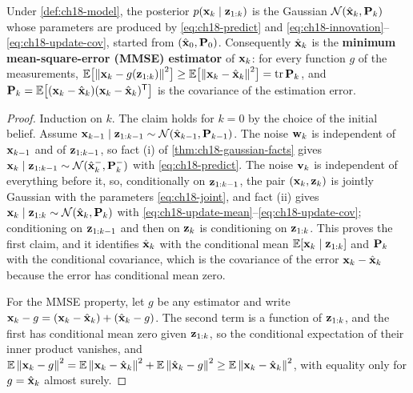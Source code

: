 \begin{theorem}
\label{thm:ch18-optimal}
Under \cref{def:ch18-model}, the posterior $p(\mathbf{x}_k\mid\mathbf{z}_{1:k})$ is
the Gaussian $\mathcal{N}(\hat{\mathbf{x}}_k,\mathbf{P}_k)$ whose parameters are
produced by \cref{eq:ch18-predict} and
\cref{eq:ch18-innovation}--\cref{eq:ch18-update-cov}, started from
$(\hat{\mathbf{x}}_0,\mathbf{P}_0)$. Consequently $\hat{\mathbf{x}}_k$ is the
\textbf{minimum mean-square-error (MMSE) estimator}
of $\mathbf{x}_k$: for every function $g$ of the measurements,
$\mathbb{E}\bigl[\left\lVert \mathbf{x}_k-g(\mathbf{z}_{1:k}) \right\rVert^2\bigr]\ge\mathbb{E}\bigl[\left\lVert \mathbf{x}_k-\hat{\mathbf{x}}_k \right\rVert^2\bigr]=\operatorname{tr}\mathbf{P}_k$,
and $\mathbf{P}_k=\mathbb{E}\bigl[(\mathbf{x}_k-\hat{\mathbf{x}}_k)(\mathbf{x}_k-\hat{\mathbf{x}}_k)^{\mathsf{T}}\bigr]$
is the covariance of the estimation error.
\end{theorem}
\begin{proof}
Induction on $k$. The claim holds for $k=0$ by the choice of the initial
belief. Assume $\mathbf{x}_{k-1}\mid\mathbf{z}_{1:k-1}\sim\mathcal{N}(\hat{\mathbf{x}}_{k-1},\mathbf{P}_{k-1})$.
The noise $\mathbf{w}_k$ is independent of $\mathbf{x}_{k-1}$ and of
$\mathbf{z}_{1:k-1}$, so fact (i) of \cref{thm:ch18-gaussian-facts} gives
$\mathbf{x}_k\mid\mathbf{z}_{1:k-1}\sim\mathcal{N}(\hat{\mathbf{x}}^-_k,\mathbf{P}^-_k)$ with
\cref{eq:ch18-predict}. The noise $\mathbf{v}_k$ is independent of everything
before it, so, conditionally on $\mathbf{z}_{1:k-1}$, the pair
$(\mathbf{x}_k,\mathbf{z}_k)$ is jointly Gaussian with the parameters
\cref{eq:ch18-joint}, and fact (ii) gives
$\mathbf{x}_k\mid\mathbf{z}_{1:k}\sim\mathcal{N}(\hat{\mathbf{x}}_k,\mathbf{P}_k)$ with
\cref{eq:ch18-update-mean}--\cref{eq:ch18-update-cov}; conditioning on
$\mathbf{z}_{1:k-1}$ and then on $\mathbf{z}_k$ is conditioning on $\mathbf{z}_{1:k}$. This
proves the first claim, and it identifies $\hat{\mathbf{x}}_k$ with the
conditional mean $\mathbb{E}[\mathbf{x}_k\mid\mathbf{z}_{1:k}]$ and $\mathbf{P}_k$ with the
conditional covariance, which is the covariance of the error
$\mathbf{x}_k-\hat{\mathbf{x}}_k$ because the error has conditional mean zero.

For the MMSE property, let $g$ be any estimator and write
$\mathbf{x}_k-g=(\mathbf{x}_k-\hat{\mathbf{x}}_k)+(\hat{\mathbf{x}}_k-g)$. The second term is a
function of $\mathbf{z}_{1:k}$, and the first has conditional mean zero given
$\mathbf{z}_{1:k}$, so the conditional expectation of their inner product
vanishes, and
$\mathbb{E}\left\lVert \mathbf{x}_k-g \right\rVert^2=\mathbb{E}\left\lVert \mathbf{x}_k-\hat{\mathbf{x}}_k \right\rVert^2+\mathbb{E}\left\lVert \hat{\mathbf{x}}_k-g \right\rVert^2\ge\mathbb{E}\left\lVert \mathbf{x}_k-\hat{\mathbf{x}}_k \right\rVert^2$,
with equality only for $g=\hat{\mathbf{x}}_k$ almost surely.
\end{proof}

